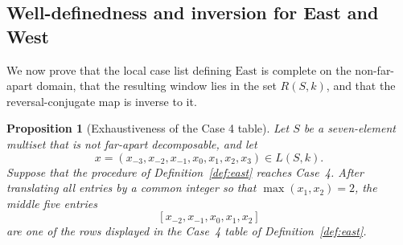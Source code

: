 \documentclass[11pt]{article}
\theoremstyle{plain}
\newtheorem{proposition}[theorem]{Proposition}
\theoremstyle{definition}
\theoremstyle{remark}
\begin{document}
\subsection{Well-definedness and inversion for East and West}
\label{subsec:east-west-inverse}

We now prove that the local case list defining \(\mathrm{East}\) is
complete on the non-far-apart domain, that the resulting window lies in the
set \(R(S,k)\), and that the reversal-conjugate map is inverse to it.

\begin{proposition}[Exhaustiveness of the Case 4 table]
\label{prop:east-case4-exhaustive}
Let \(S\) be a seven-element multiset that is not far-apart decomposable, and
let
\[
  x=(x_{-3},x_{-2},x_{-1},x_0,x_1,x_2,x_3)\in L(S,k).
\]
Suppose that the procedure of Definition~\ref{def:east} reaches Case~4. After
translating all entries by a common integer so that
\(\max(x_1,x_2)=2\), the middle five entries
\[
  [x_{-2},x_{-1},x_0,x_1,x_2]
\]
are one of the rows displayed in the Case~4 table of
Definition~\ref{def:east}.
\end{proposition}
\end{document}
